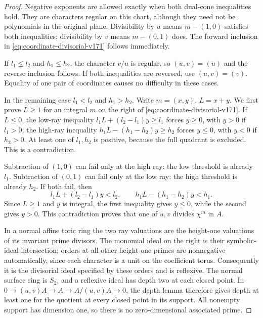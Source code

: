 \begin{proof}
Negative exponents are allowed exactly when both dual-cone
inequalities hold. They are characters regular on this chart,
although they need not be polynomials in the original plane. Divisibility
by $u$ means $m-(1,0)$ satisfies both inequalities; divisibility by
$v$ means $m-(0,1)$ does. The forward inclusion in
\eqref{eq:coordinate-divisorial-v171} follows immediately.

If $l_1\leq l_2$ and $h_1\leq h_2$, the character $v/u$ is regular,
so $(u,v)=(u)$ and the reverse inclusion follows. If both inequalities
are reversed, use $(u,v)=(v)$. Equality of one pair of coordinates
causes no difficulty in these cases.

In the remaining case $l_1<l_2$ and $h_1>h_2$. Write $m=(x,y)$,
$L=x+y$. We first prove $L\geq1$ for an integral $m$ on the right
of \eqref{eq:coordinate-divisorial-v171}. If $L\leq0$, the low-ray
inequality
$l_1L+(l_2-l_1)y\geq l_1$ forces $y\geq0$, with $y>0$ if $l_1>0$;
the high-ray inequality
$h_1L-(h_1-h_2)y\geq h_2$ forces $y\leq0$, with $y<0$ if $h_2>0$.
At least one of $l_1,h_2$ is positive, because the full quadrant is
excluded. This is a contradiction.

Subtraction of $(1,0)$ can fail only at the high ray: the low
threshold is already $l_1$. Subtraction of $(0,1)$ can fail only
at the low ray: the high threshold is already $h_2$. If both fail,
then
\[
 l_1L+(l_2-l_1)y<l_2,
 \qquad h_1L-(h_1-h_2)y<h_1.
\]
Since $L\geq1$ and $y$ is integral, the first inequality gives
$y\leq0$, while the second gives $y>0$. This contradiction proves
that one of $u,v$ divides $\chi^m$ in $A$.

In a normal affine toric ring the two ray valuations are the
height-one valuations of its invariant prime divisors. The monomial
ideal on the right is their symbolic-ideal intersection; orders at
all other height-one primes are nonnegative automatically, since
each character is a unit on the coefficient torus. Consequently it
is the divisorial ideal specified by these orders and is reflexive.
The normal surface ring is $S_2$, and a reflexive ideal has depth
two at each closed point. In
$0\to (u,v)A\to A\to A/(u,v)A\to0$, the depth lemma therefore gives
depth at least one for the quotient at every closed point in its
support. All nonempty support has dimension one, so there is no
zero-dimensional associated prime.
\end{proof}

